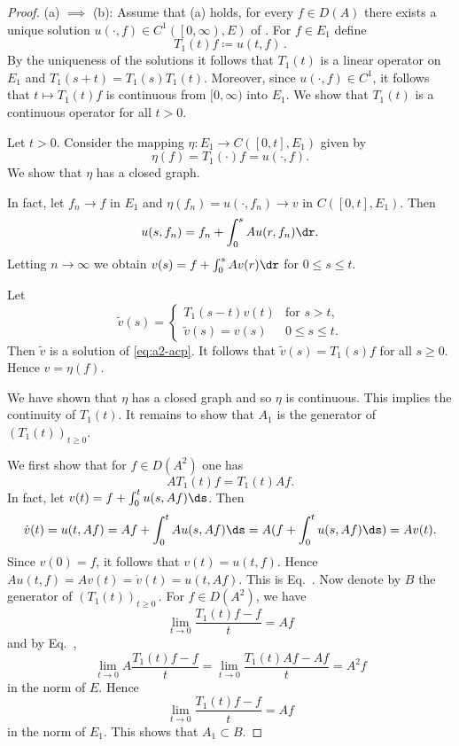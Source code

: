 \begin{proof} (a) $\implies$ (b):   
Assume that (a) holds, \ie for every $f \in D(A)$ there exists a unique solution $u(\cdot,f) \in C^{1}(\left[0,\infty\right),E)$ of \label{eq:a2.acp}.
For $f \in E_{1}$ define 
\[
T_{1}(t)f \coloneqq u(t,f)\, .
\]
By the uniqueness of the solutions it follows that $T_{1}(t)$ is a linear operator on $E_{1}$ and $T_{1}(s+t) = T_{1}(s)T_{1}(t)$.
Moreover, since $u(\cdot,f) \in C^{1}$, it follows that $t \mapsto T_{1}(t)f$ is continuous from $[0,\infty)$ into $E_{1}$.
We show that $T_{1}(t)$ is a continuous operator for all $t > 0$.

Let $t > 0$.
Consider the mapping $\eta \colon E_{1} \to C([0,t],E_{1})$ given by 
\[
\eta(f) = T_{1}(\cdot)f = u(\cdot,f) .
\]
We show that $\eta$ has a closed graph.

In fact, let $f_{n} \to f$ in $E_{1}$ and $\eta(f_{n}) = u(\cdot,f_{n}) \to v$ in $C([0,t],E_{1})$.
Then 
\[
u(s,f_{n}) = f_{n} + \int_{0}^{s} Au(r,f_{n}) \dr .
\]
Letting $n \to \infty$ we obtain $v(s) = f + \int_{0}^{s} Av(r) \dr$ for $0 \leq s \leq t$.

Let 
\[
\tilde{v}(s) = 
\begin{cases}
    T_{1}(s-t)v(t)      & \text{for $s > t$,}\\
    \tilde{v}(s) = v(s) & \text{$0 \leq s \leq t$.}
\end{cases}
\]
Then $\tilde{v}$ is a solution of \eqref{eq:a2-acp}.
It follows that $\tilde{v}(s) = T_{1}(s)f$ for all $s \geq 0$.
Hence $v = \eta(f)$.

We have shown that $\eta$ has a closed graph and so $\eta$ is continuous.
This implies the continuity of\/ $T_{1}(t)$.
It remains to show that $A_{1}$ is the generator of\/ $(T_{1}(t))_{t \geq 0}$.

We first show that for $f \in D(A^{2})$ one has
\begin{equation}\label{eq:a2-1.1}
AT_{1}(t)f = T_{1}(t)Af.
\end{equation}
In fact, let $v(t) = f + \int_{0}^{t} u(s,Af) \ds$.
Then 
\[
\dot{v}(t) = u(t,Af) = Af + \int_{0}^{t} Au(s,Af) \ds = A(f + \int_{0}^{t} u(s,Af) \ds) = Av(t). 
\]
Since $v(0) = f$, it follows that $v(t) = u(t,f)$.
Hence $Au(t,f) = Av(t) = \dot{v}(t) = u(t,Af)$.
This is Eq.~.
Now denote by $B$ the generator of\/ $(T_{1}(t))_{t \geq 0}$\,.
For $f \in D(A^{2})$, we have
\[
    \lim_{t \to 0} \frac{T_{1}(t)f - f}{t} = Af
\]
and by Eq.~,
\[
    \lim_{t \to 0} A\frac{T_{1}(t)f - f}{t} = 
    \lim_{t \to 0} \frac{T_{1}(t)Af - Af}{t} = A^{2}f
\]
in the norm of\/ $E$.
Hence 
\[ 
\lim_{t \to 0} \frac{T_{1}(t)f - f}{t} = Af
\]
in the norm of\/ $E_{1}$.
This shows that $A_{1} \subset B$.


\end{proof}
